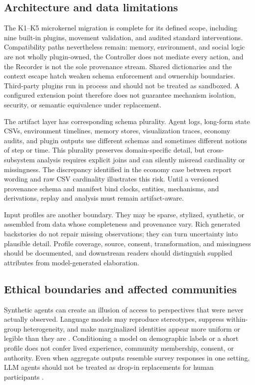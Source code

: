 \subsection{Architecture and data limitations}

The K1--K5 microkernel migration is complete for its defined scope, including
nine built-in plugins, movement validation, and audited standard interventions.
Compatibility paths nevertheless remain: memory, environment, and social
logic are not wholly plugin-owned, the Controller does not mediate every
action, and the Recorder is not the sole provenance stream.  Shared
dictionaries and the context escape hatch weaken schema enforcement and
ownership boundaries.
Third-party plugins run in process and should not be treated as sandboxed.  A
configured extension point therefore does not guarantee mechanism isolation,
security, or semantic equivalence under replacement.

The artifact layer has corresponding schema plurality.  Agent logs, long-form
state CSVs, environment timelines, memory stores, visualization traces,
economy audits, and plugin outputs use different schemas and sometimes
different notions of step or time.  This plurality preserves domain-specific
detail, but cross-subsystem analysis requires explicit joins and can silently
misread cardinality or missingness.  The discrepancy identified in the
economy case between report wording and raw CSV cardinality illustrates this
risk.  Until a versioned provenance schema and manifest bind clocks, entities,
mechanisms, and derivations, replay and analysis must remain artifact-aware.

Input profiles are another boundary.  They may be sparse, stylized,
synthetic, or assembled from data whose completeness and provenance vary.
Rich generated backstories do not repair missing observations; they can turn
uncertainty into plausible detail.  Profile coverage, source, consent,
transformation, and missingness should be documented, and downstream readers
should distinguish supplied attributes from model-generated elaboration.

\subsection{Ethical boundaries and affected communities}

Synthetic agents can create an illusion of access to perspectives that were
never actually observed.  Language models may reproduce stereotypes, suppress
within-group heterogeneity, and make marginalized identities appear more
uniform or legible than they are \citep{wang2025flatten}.  Conditioning a model
on demographic labels or a short profile does not confer lived experience,
community membership, consent, or authority.  Even when aggregate outputs
resemble survey responses in one setting, LLM agents should not be treated as
drop-in replacements for human participants \citep{dillion2023replace}.

